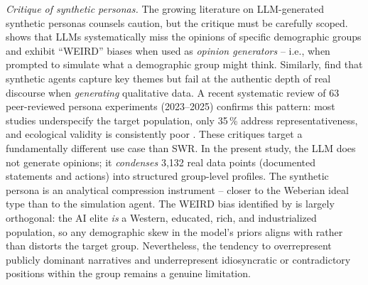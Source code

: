 \documentclass[12pt,a4paper]{article}
\begin{document}
\emph{Critique of synthetic personas.} The growing literature on LLM-generated synthetic personas counsels caution, but the critique must be carefully scoped. \citet{Santurkar2023} shows that LLMs systematically miss the opinions of specific demographic groups and exhibit ``WEIRD'' biases when used as \emph{opinion generators} -- i.e., when prompted to simulate what a demographic group might think. Similarly, \citet{Argyle2023} find that synthetic agents capture key themes but fail at the authentic depth of real discourse when \emph{generating} qualitative data. A recent systematic review of 63 peer-reviewed persona experiments (2023--2025) confirms this pattern: most studies underspecify the target population, only 35\,\% address representativeness, and ecological validity is consistently poor \citep{Batzner2025WhosePersonae}. These critiques target a fundamentally different use case than SWR. In the present study, the LLM does not generate opinions; it \emph{condenses} 3,132 real data points (documented statements and actions) into structured group-level profiles. The synthetic persona is an analytical compression instrument -- closer to the Weberian ideal type than to the simulation agent. The WEIRD bias identified by \citeauthor{Santurkar2023} is largely orthogonal: the AI elite \emph{is} a Western, educated, rich, and industrialized population, so any demographic skew in the model's priors aligns with rather than distorts the target group. Nevertheless, the tendency to overrepresent publicly dominant narratives and underrepresent idiosyncratic or contradictory positions within the group remains a genuine limitation.
\end{document}
